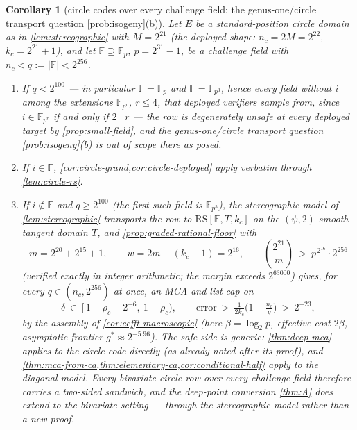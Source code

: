 \documentclass[11pt]{article}
\newtheorem{corollary}[corollary]{Corollary}
\theoremstyle{definition}
\theoremstyle{remark}
\newcommand{\F}{\mathbb{F}}
\newcommand{\RS}{\mathrm{RS}}
\begin{document}
\begin{corollary}[circle codes over every challenge field; the genus-one/circle transport question \cref{prob:isogeny}\textup{(b)}]\label{cor:circle-anyfield}
Let $E$ be a standard-position circle domain as in \cref{lem:stereographic} with $M=2^{21}$ \textup(the deployed shape: $n_c=2M=2^{22}$, $k_c=2^{21}+1$\textup), and let $\F\supseteq\F_p$, $p=2^{31}-1$, be a challenge field with $n_c<q:=|\F|<2^{256}$.
\begin{enumerate}[label=\textup{(\roman*)}]
\item If $q<2^{100}$ --- in particular $\F=\F_p$ and $\F=\F_{p^3}$, hence every field without $i$ among the extensions $\F_{p^r}$, $r\le4$, that deployed verifiers sample from, since $i\in\F_{p^r}$ if and only if $2\mid r$ --- the row is degenerately unsafe at every deployed target by \cref{prop:small-field}, and the genus-one/circle transport question \cref{prob:isogeny}\textup{(b)} is out of scope there as posed.
\item If $i\in\F$, \cref{cor:circle-grand,cor:circle-deployed} apply verbatim through \cref{lem:circle-rs}.
\item If $i\notin\F$ and $q\ge2^{100}$ \textup(the first such field is $\F_{p^5}$\textup), the stereographic model of \cref{lem:stereographic} transports the row to $\RS[\F,T,k_c]$ on the $(\psi,2)$-smooth tangent domain $T$, and \cref{prop:graded-rational-floor} with
\[
m=2^{20}+2^{15}+1,\qquad w=2m-(k_c+1)=2^{16},\qquad
\binom{2^{21}}{m}\ >\ p^{\,2^{16}}\cdot2^{256}
\]
\textup(verified exactly in integer arithmetic; the margin exceeds $2^{63000}$\textup) gives, for every $q\in(n_c,2^{256})$ at once, an MCA and list cap on
\[
\delta\ \in\ \bigl[\,1-\rho_c-2^{-6},\ 1-\rho_c\bigr),
\qquad
\text{error}\ >\ \tfrac1{2k_c}\bigl(1-\tfrac{n_c}q\bigr)\ >\ 2^{-23},
\]
by the assembly of \cref{cor:ecfft-macroscopic} \textup(here $\beta=\log_2p$, effective cost $2\beta$, asymptotic frontier $g^*\approx2^{-5.96}$\textup). The safe side is generic: \cref{thm:deep-mca} applies to the circle code directly \textup(as already noted after its proof\textup), and \cref{thm:mca-from-ca,thm:elementary-ca,cor:conditional-half} apply to the diagonal model. Every bivariate circle row over every challenge field therefore carries a two-sided sandwich, and the deep-point conversion \cref{thm:A} does extend to the bivariate setting --- through the stereographic model rather than a new proof.
\end{enumerate}
\end{corollary}
\end{document}
